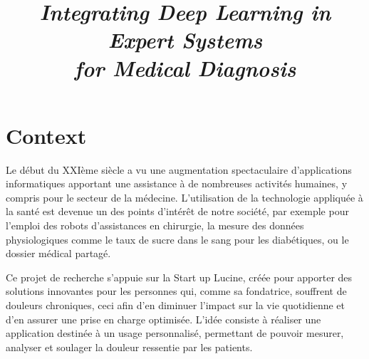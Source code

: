\documentclass[french]{article}
\date{}
\title{\emph{Integrating Deep Learning in Expert Systems\\ for Medical Diagnosis}}
\begin{document}
\maketitle

\section{Context}
\label{sec:orga8bb14f}

Le début  du XXIème  siècle a vu  une augmentation  spectaculaire d’applications
informatiques apportant  une assistance  à de  nombreuses activités  humaines, y
compris  pour  le  secteur  de  la médecine.  L’utilisation  de  la  technologie
appliquée à la santé  est devenue un des points d’intérêt  de notre société, par
exemple  pour l’emploi  des robots  d’assistances  en chirurgie,  la mesure  des
données physiologiques comme le taux de sucre dans le sang pour les diabétiques,
ou le dossier médical partagé.


Ce projet de recherche s’appuie sur la Start up Lucine, créée pour apporter des
solutions innovantes pour les personnes qui, comme sa fondatrice, souffrent de
douleurs chroniques, ceci afin d’en diminuer l’impact sur la vie quotidienne et
d’en assurer une prise en charge optimisée. L’idée consiste à réaliser une
application destinée à un usage personnalisé, permettant de pouvoir mesurer,
analyser et soulager la douleur ressentie par les patients.

\end{document}
